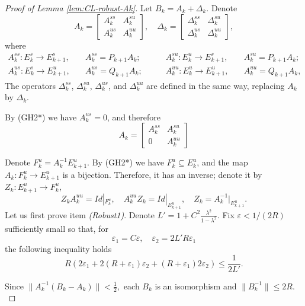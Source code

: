 \documentclass[12pt]{article}
\theoremstyle{definition}
\begin{document}
\begin{proof}[Proof of Lemma \ref{lem:CL-robust-Ak}]
    Let $B_k = A_k + \Delta_k$. Denote 
    $$
    A_k = \begin{bmatrix}
A_k^{ss} & A_k^{su} \\
A_k^{us} & A_k^{uu}
\end{bmatrix}
, \quad 
    \Delta_k = \begin{bmatrix}
\Delta_k^{ss} & \Delta_k^{su} \\
\Delta_k^{us} & \Delta_k^{uu}
\end{bmatrix},
    $$
where 
\begin{align*}
A_k^{ss}: E_k^s \to E_{k+1}^s, & \quad  A_k^{ss} = P_{k+1}A_k;& \qquad A_k^{su}: E_k^u \to E_{k+1}^s, & \quad  A_k^{su} = P_{k+1}A_k;\\
A_k^{us}: E_k^s \to E_{k+1}^u, & \quad  A_k^{us} = Q_{k+1}A_k;& \qquad
A_k^{uu}: E_k^u \to E_{k+1}^u, & \quad  A_k^{uu} = Q_{k+1}A_k,
\end{align*}
The operators $\Delta_k^{ss}$, $\Delta_k^{su}$, $\Delta_k^{us}$, and $\Delta_k^{uu}$ are defined in the same way, replacing $A_k$ by $\Delta_k$.

By (GH2*) we have $A_k^{us}=0$, and therefore
    $$
    A_k = \begin{bmatrix}
A_k^{ss} & A_k^{su} \\
0 & A_k^{uu}
\end{bmatrix}
$$

Denote 
$
F_k^u = A_k^{-1} E_{k+1}^u.
$
By (GH2*) we have $F_k^u \subseteq E_k^u$, and the map $A_k:F_k^u \to E_{k+1}^u$ is a bijection. Therefore, it has an inverse; denote it by $Z_k: E_{k+1}^u \to F_k^u$,
$$
Z_kA_k^{uu} = Id|_{F_k^u}, \quad A_k^{uu}Z_k = Id|_{E_{k+1}^u}, \quad Z_k = A_k^{-1}|_{E^u_{k+1}}.
$$
Let us first prove item \textit{(Robust1)}.
Denote $L' = 1+ C^2 \frac{\lambda^2}{1-\lambda^2}$. Fix  $\varepsilon<1/(2R)$ sufficiently small so that, for
\begin{equation}\label{eq:defep1ep2}
\varepsilon_1 = C\varepsilon, \quad \varepsilon_2 = 2L'R\varepsilon_1
\end{equation}
the following inequality holds
\begin{equation}\label{eq:condep1ep2}
    R(2\varepsilon_1 + 2(R+\varepsilon_1)\varepsilon_2 + (R+\varepsilon_1)2\varepsilon_2) \leq \frac{1}{2L'}.
\end{equation}

Since
$
\|A_k^{-1}(B_k-A_k)\|<\frac{1}{2},
$
each $B_k$ is an isomorphism and
$
\|B_k^{-1}\|\leq 2R.
$


\end{proof}
\end{document}
